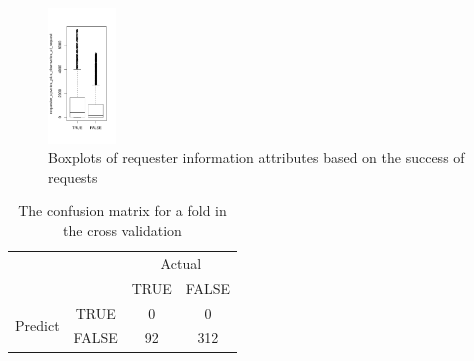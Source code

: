 \begin{figure}
	\includegraphics[width=0.16\textwidth]{data/requester_upvotes_plus_downvotes_at_request}
	\vspace*{-0.6cm}
	\caption{Boxplots of requester information attributes based on the success of requests}
	\vspace*{-0.6cm}
	\label{boxplot}
\end{figure}

\begin{table}[]
	\centering
	\caption{The confusion matrix for a fold in the cross validation}
	\label{confusion1}
	\begin{tabular}{|c|c|c|c|}
		\hline
		\multicolumn{2}{|c|}{\multirow{2}{*}{}}                & \multicolumn{2}{c|}{Actual}                            \\ \cline{3-4} 
		\multicolumn{2}{|c|}{}                                 & \multicolumn{1}{c|}{TRUE} & \multicolumn{1}{c|}{FALSE} \\ \hline
		\multicolumn{1}{|c|}{\multirow{2}{*}{Predict}} & TRUE  & 0                         & 0                          \\ \cline{2-4} 
		\multicolumn{1}{|c|}{}                         & FALSE & 92                        & 312                        \\ \hline
	\end{tabular}
	\vspace*{-0.6cm}
\end{table}

